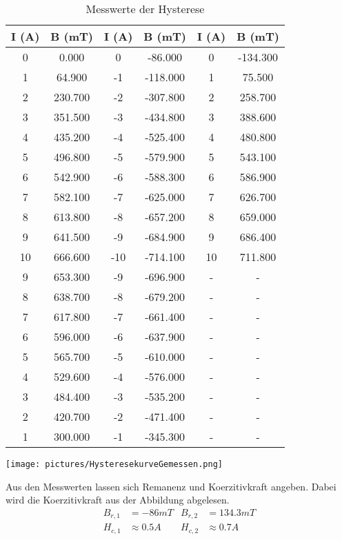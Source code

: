 \begin{table}
\centering
\caption{Messwerte der Hysterese}
\begin{tabular}{c c c c c c}
  \toprule
   I (A) &  B (mT) &  I (A) &  B (mT) &  I (A) &  B (mT)\\
  \midrule
     0 &        0.000 &         0 &      -86.000 &   0 &     -134.300 \\
     1 &       64.900 &        -1 &     -118.000 &   1 &       75.500 \\
     2 &      230.700 &        -2 &     -307.800 &   2 &      258.700 \\
     3 &      351.500 &        -3 &     -434.800 &   3 &      388.600 \\
     4 &      435.200 &        -4 &     -525.400 &   4 &      480.800 \\
     5 &      496.800 &        -5 &     -579.900 &   5 &      543.100 \\
     6 &      542.900 &        -6 &     -588.300 &   6 &      586.900 \\
     7 &      582.100 &        -7 &     -625.000 &   7 &      626.700 \\
     8 &      613.800 &        -8 &     -657.200 &   8 &      659.000 \\
     9 &      641.500 &        -9 &     -684.900 &   9 &      686.400 \\
    10 &      666.600 &       -10 &     -714.100 &  10 &      711.800 \\
     9 &      653.300 &        -9 &     -696.900 &  -  &        -     \\
     8 &      638.700 &        -8 &     -679.200 &  -  &        -     \\
     7 &      617.800 &        -7 &     -661.400 &  -  &        -     \\
     6 &      596.000 &        -6 &     -637.900 &  -  &        -     \\
     5 &      565.700 &        -5 &     -610.000 &  -  &        -     \\
     4 &      529.600 &        -4 &     -576.000 &  -  &        -     \\
     3 &      484.400 &        -3 &     -535.200 &  -  &        -     \\
     2 &      420.700 &        -2 &     -471.400 &  -  &        -     \\
     1 &      300.000 &        -1 &     -345.300 &  -  &        -     \\
  \bottomrule
  \end{tabular}
\end{table}

\texttt{[image: pictures/HysteresekurveGemessen.png]}    %

Aus den Messwerten lassen sich Remanenz und Koerzitivkraft angeben.
Dabei wird die Koerzitivkraft aus der Abbildung abgelesen.
\begin{align*}
  B_{r,1} &= -86 mT &  B_{r,2} &= 134.3 mT \\
  H_{c,1} &\approx 0.5A & H_{c,2} &\approx 0.7A
\end{align*}